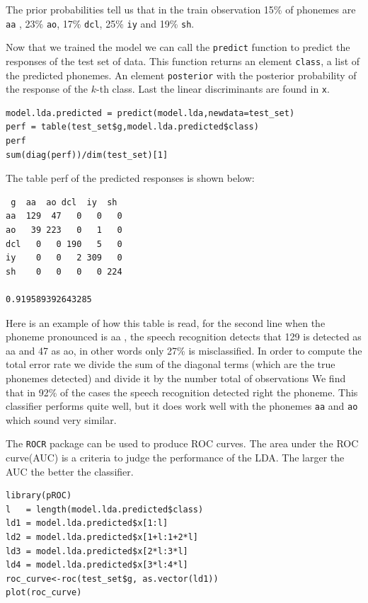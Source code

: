 \documentclass[]{report}
\begin{document}
The prior probabilities tell us that in the train observation 15\% of phonemes are \texttt{aa} , 23\% \texttt{ao}, 17\% \texttt{dcl}, 25\% \texttt{iy} and 19\% \texttt{sh}.

Now that we trained the model we can call the \texttt{predict} function to predict the responses of the test set of data. This function returns an element \texttt{class}, a list of the predicted phonemes. An element \texttt{posterior} with the posterior probability of the response of the $k$-th class.  Last the linear discriminants are found in \texttt{x}.

\begin{lstlisting}
model.lda.predicted = predict(model.lda,newdata=test_set)
perf = table(test_set$g,model.lda.predicted$class)
perf
sum(diag(perf))/dim(test_set)[1]
\end{lstlisting}

The table perf of the predicted responses is shown below:
\begin{center}
\begin{verbatim}
 g	aa  ao dcl  iy  sh
aa  129  47   0   0   0
ao   39 223   0   1   0
dcl   0   0 190   5   0
iy    0   0   2 309   0
sh    0   0   0   0 224

0.919589392643285
\end{verbatim}
\end{center}

Here is an example of how this table is read, for the second line
when the phoneme pronounced is aa , the speech recognition detects that 129 is detected as aa and 47 as ao, in other words only 27\% is misclassified.
In order to compute the total error rate we divide the sum of the diagonal terms (which are the true phonemes detected) and divide it by the number total of observations We find that in 92\% of the cases the speech recognition detected right the phoneme. This classifier performs quite well, but it does work well with the phonemes \texttt{aa} and \texttt{ao} which sound very similar.

The \texttt{ROCR} package can be used to produce ROC curves. The area under the ROC curve(AUC) is a criteria to judge the performance of the LDA. The larger the AUC the better the classifier.
\begin{lstlisting}
library(pROC)
l   = length(model.lda.predicted$class)
ld1 = model.lda.predicted$x[1:l]
ld2 = model.lda.predicted$x[1+l:1+2*l]
ld3 = model.lda.predicted$x[2*l:3*l]
ld4 = model.lda.predicted$x[3*l:4*l]
roc_curve<-roc(test_set$g, as.vector(ld1))
plot(roc_curve)
\end{lstlisting}
\end{document}
